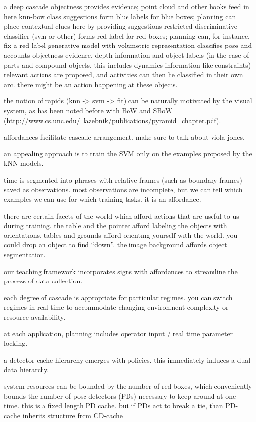 \documentclass[12pt]{article}
\numberwithin{equation}{section}
\numberwithin{table}{section}
\numberwithin{figure}{section}
\begin{document}
a deep cascade
objectness provides evidence; point cloud and other hooks feed in here
knn-bow class suggestions form blue labels for blue boxes; planning can place contextual clues here by providing suggestions
restricted discriminative classifier (svm or other) forms red label for red boxes; planning can, for instance, fix a red label 
generative model with volumetric representation classifies pose and accounts objectness evidence, depth information and object labels (in the case of parts and compound objects, this includes dynamics information like constraints)
relevant actions are proposed, and activities can then be classified in their own arc. there might be an action happening at these objects.

the notion of rapids (knn -> svm -> fit) can be naturally motivated by the visual system, as has been noted before with BoW and SBoW (http://www.cs.unc.edu/~lazebnik/publications/pyramid_chapter.pdf).

affordances facilitate cascade arrangement. make sure to talk about viola-jones.

an appealing approach is to train the SVM only on the examples proposed by the kNN models.

time is segmented into phrases with relative frames (such as boundary frames) saved as observations. most observations are incomplete, but we can tell which examples we can use for which training tasks.  it is an affordance.

there are certain facets of the world which afford actions that are useful to us during training. the table and the pointer afford labeling the objects with orientations. tables and grounds afford orienting yourself with the world. you could drop an object to find “down”. the image background affords object segmentation.

our teaching framework incorporates signs with affordances to streamline the process of data collection.

each degree of cascade is appropriate for particular regimes. you can switch regimes in real time to accommodate changing environment complexity or resource availability.

at each application, planning includes operator input / real time parameter locking.

a detector cache hierarchy emerges with policies. this immediately induces a dual data hierarchy.

system resources can be bounded by the number of red boxes, which conveniently bounds the number of pose detectors (PDs) necessary to keep around at one time. this is a fixed length PD cache. but if PDs act to break a tie, than PD-cache inherits structure from CD-cache
\end{document}
